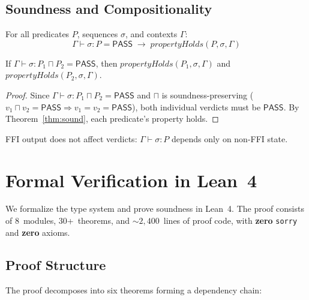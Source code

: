 \documentclass[runningheads]{llncs}
\newcommand{\PASS}{\ensuremath{\mathsf{PASS}}\xspace}
\newcommand{\seq}{\sigma}
\newcommand{\pred}{P}
\newcommand{\judg}[3]{#1 \vdash #2 : #3}
\begin{document}
\subsection{Soundness and Compositionality}%
\label{sec:compositionality}

\begin{theorem}\label{thm:sound}
For all predicates $\pred$, sequences $\seq$, and contexts $\Gamma$:
\[
  \judg{\Gamma}{\seq}{\pred} = \PASS
  \;\longrightarrow\;
  \mathit{propertyHolds}(\pred, \seq, \Gamma)
\]
\end{theorem}

\begin{corollary}\label{cor:comp}
If $\judg{\Gamma}{\seq}{\pred_1 \sqcap \pred_2} = \PASS$, then
$\mathit{propertyHolds}(\pred_1, \seq, \Gamma)$ and
$\mathit{propertyHolds}(\pred_2, \seq, \Gamma)$.
\end{corollary}

\begin{proof}
Since $\judg{\Gamma}{\seq}{\pred_1 \sqcap \pred_2} = \PASS$ and
$\sqcap$ is soundness-preserving ($v_1 \sqcap v_2 = \PASS \Rightarrow
v_1 = v_2 = \PASS$), both individual verdicts must be \PASS.
By Theorem~\ref{thm:sound}, each predicate's property holds.
\end{proof}

\begin{corollary}\label{cor:slot}
FFI output does not affect verdicts: $\judg{\Gamma}{\seq}{\pred}$
depends only on non-FFI state.
\end{corollary}

\section{Formal Verification in Lean~4}\label{sec:proof}

We formalize the type system and prove soundness in Lean~4.
The proof consists of 8~modules, 30+~theorems, and
${\sim}2{,}400$~lines of proof code, with \textbf{zero}
\texttt{sorry} and \textbf{zero} axioms.

\subsection{Proof Structure}\label{sec:proof-structure}

The proof decomposes into six theorems forming a dependency chain:
\end{document}
